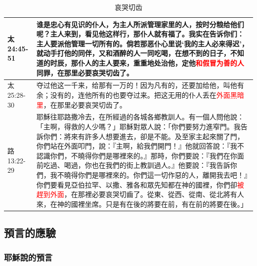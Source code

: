 \begin{table}[H]
\begin{tabular}{p{4.2em}|p{44.3em}}
太24:45-51 & 谁是忠心有见识的仆人，为主人所派管理家里的人，按时分粮给他们呢？主人来到，看见他这样行，那仆人就有福了。我实在告诉你们：主人要派他管理一切所有的。倘若那恶仆心里说‘我的主人必来得迟’，就动手打他的同伴，又和酒醉的人一同吃喝，在想不到的日子，不知道的时辰，那仆人的主人要来，重重地处治他，定他\textcolor{red}{和假冒为善的人}同罪，在那里必要哀哭切齿了。\\ \midrule

太25:28-30 &夺过他这一千来，给那有一万的！因为凡有的，还要加给他，叫他有余；没有的，连他所有的也要夺过来。把这无用的仆人丢在\textcolor{red}{外面黑暗里}，在那里必要哀哭切齿了。\\  \midrule 
路13:22-29&耶穌往耶路撒冷去，在所經過的各城各鄉教訓人。有一個人問他說：「主啊，得救的人少嗎？」耶穌對眾人說：「你們要努力進窄門。我告訴你們：將來有許多人想要進去，卻是不能。及至家主起來關了門，你們站在外面叩門，說：『主啊，給我們開門！』他就回答說：『我不認識你們，不曉得你們是哪裡來的。』那時，你們要說：『我們在你面前吃過、喝過，你也在我們的街上教訓過人。』他要說：『我告訴你們，我不曉得你們是哪裡來的。你們這一切作惡的人，離開我去吧！』你們要看見亞伯拉罕、以撒、雅各和眾先知都在神的國裡，你們卻\textcolor{red}{被趕到外面}，在那裡必要哀哭切齒了。從東、從西、從南、從北將有人來，在神的國裡坐席。只是有在後的將要在前，有在前的將要在後。」\\    \bottomrule
    \end{tabular}%
  \label{tab:addlabel}%
 \caption{哀哭切齿}  
\end{table}%



\subsection{預言的應驗}
\subsubsection{耶穌說的預言}




